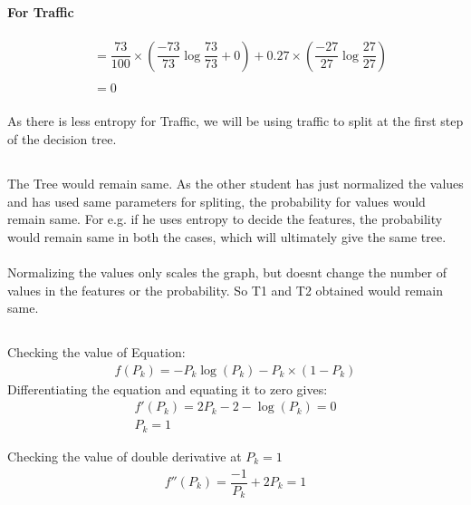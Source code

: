 \documentclass[paper=a4, fontsize=11pt]{scrartcl} %
\numberwithin{equation}{section} %
\numberwithin{figure}{section} %
\numberwithin{table}{section} %
\begin{document}
\paragraph{For Traffic}
\begin{align*} 
&= \dfrac{73}{100} \times (\dfrac{-73}{73}\log\dfrac{73}{73} + 0) + 0.27 \times (\dfrac{-27}{27}\log\dfrac{27}{27})\\\\
&= 0
\end{align*}

\paragraph{}
As there is less entropy for Traffic, we will be using traffic to split at the first step of the decision tree. 

\subsection{}
\paragraph{}
The Tree would remain same. As the other student has just normalized the values and has used same parameters for spliting, the probability for values would remain same. For e.g. if he uses entropy to decide the features, the probability would remain same in both the cases, which will ultimately give the same tree.\\\\
Normalizing the values only scales the graph, but doesnt change the number of values in the features or the probability. So T1 and T2 obtained would remain same.

\subsection{}

Checking the value of Equation:
\begin{align*} 
f(P_{k}) = - P_{k} \log(P_{k}) - P_{k}\times(1 - P_{k})
\end{align*}
Differentiating the equation and equating it to zero gives:
\begin{align*} 
f'(P_{k}) = 2P_{k} - 2 - \log(P_{k}) = 0\\
P_{k} = 1
\end{align*}

Checking the value of double derivative at \begin{math}P_{k} = 1
\end{math}
\begin{align*} 
f''(P_{k}) = \dfrac{-1}{P_{k}} + 2P_{k} = 1
\end{align*}
\end{document}
